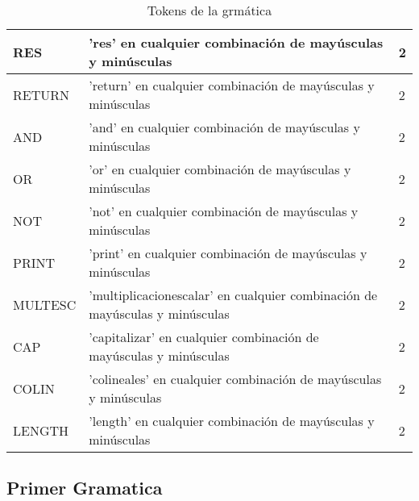 \begin{table}[!htb]
\begin{center}
\begin{tabular}{| l | l | l |}
\hline
RES & 'res' en cualquier combinación de mayúsculas y minúsculas & 2 \\
\hline
RETURN & 'return' en cualquier combinación de mayúsculas y minúsculas & 2 \\
\hline
AND & 'and' en cualquier combinación de mayúsculas y minúsculas & 2 \\
\hline
OR & 'or' en cualquier combinación de mayúsculas y minúsculas & 2 \\
\hline
NOT 	& 'not' en cualquier combinación de mayúsculas y minúsculas & 2 \\
\hline
PRINT & 'print' en cualquier combinación de mayúsculas y minúsculas & 2 \\
\hline
MULTESC & 'multiplicacionescalar' en cualquier combinación de mayúsculas y minúsculas & 2 \\
\hline
CAP & 'capitalizar' en cualquier combinación de mayúsculas y minúsculas & 2 \\
\hline
COLIN & 'colineales' en cualquier combinación de mayúsculas y minúsculas & 2 \\
\hline
LENGTH & 'length' en cualquier combinación de mayúsculas y minúsculas & 2 \\
\hline

\end{tabular}
\end{center}
\caption{Tokens de la grmática}\label{tab-tokens}
\end{table}



\subsection{Primer Gramatica}